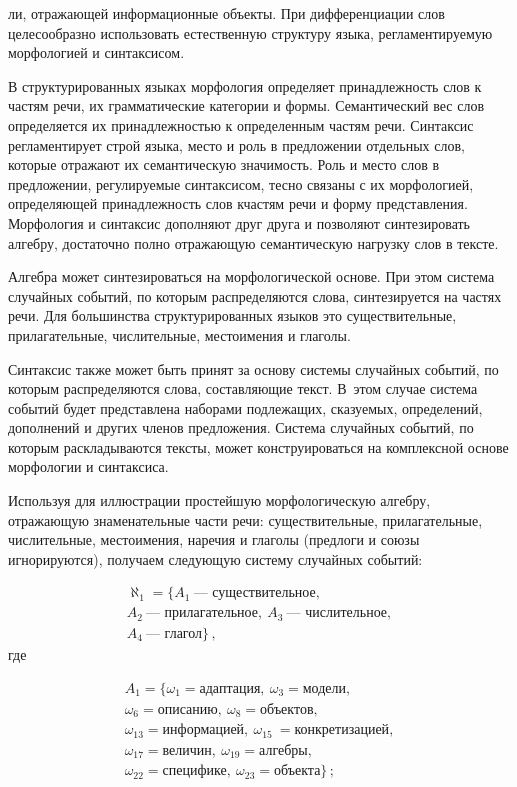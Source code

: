 \begin{multicols}{2}
\noindent
ли,
отражающей информационные объекты. При дифференциации слов
целесообразно использовать естественную структуру языка, регламентируемую
морфологией и синтаксисом.

  В структурированных языках морфология определяет принадлежность слов к
частям речи, их грамматические категории и формы. Семантический вес слов
определяется их принадлежностью к определенным частям речи. Синтаксис
регламентирует строй языка, место и роль в предложении отдельных слов,
которые отражают их семантическую значимость. Роль и место слов в
предложении, регули\-ру\-емые синтаксисом, тесно связаны с их морфологией,
определяющей принадлежность слов к\linebreak частям речи и форму представления.
Морфология и синтаксис дополняют друг друга и позволяют синтезировать
алгебру, достаточно полно отражающую семантическую нагрузку слов в тексте.

  Алгебра может синтезироваться на морфологической основе. При этом
система случайных \mbox{событий}, по которым распределяются слова, синтезируется
на частях речи. Для большинства структурированных языков это
существительные, прилагательные, числительные, местоимения и глаголы.

  Синтаксис также может быть принят за основу системы случайных событий,
по которым распределяются слова, составляющие текст. В~этом случае система
событий будет представлена наборами подлежащих, сказуемых, определений,
дополнений и других членов предложения. Система случайных событий, по
которым раскладываются тексты, может конструироваться на комплексной
основе морфологии и синтаксиса.

  Используя для иллюстрации простейшую морфологическую алгебру,
отражающую знаменательные части речи: существительные, прилагательные,
числительные, местоимения, наречия и глаголы (предлоги и союзы
игнорируются), получаем следующую систему случайных событий:

\vspace*{-2pt}

\noindent
  \begin{multline}
\aleph_1 = \{A_1~\mbox{--- существительное},\\
A_2~\mbox{--- прилагательное},\ A_3~\mbox{---
числительное},\\
A_4~\mbox{--- глагол}\}\,,
\label{e5-kuz}
\end{multline}
где

\vspace*{-2pt}

\noindent
\begin{multline*}
A_1=\{\omega_1 = \mbox{адаптация},\ \omega_3= \mbox{модели},\\
\omega_6=
\mbox{описанию},\ \omega_8= \mbox{объектов},\\
\omega_{13}= \mbox{информацией},\ \omega_{15}\ = \mbox{конкретизацией},\\
\omega_{17} = \mbox{величин},\ \omega_{19} = \mbox{алгебры},\\
\omega_{22} =
\mbox{специфике},\ \omega_{23} = \mbox{объекта}\}\,;
\end{multline*}


\end{multicols}
